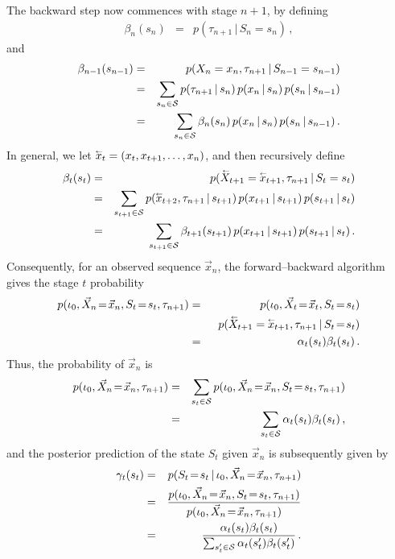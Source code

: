 \documentclass[a4paper]{article}
\newcommand{\rvec}[1]{\accentset{\leftarrow}{#1}}
\begin{document}
The backward step now commences with stage $n+1$, by defining
\begin{eqnarray}
  \beta_{n}(s_{n}) & = & p(\tau_{n+1}\,|\,S_n=s_{n})
\,,
\end{eqnarray}
and 
\begin{eqnarray}
  \beta_{n-1}(s_{n-1}) & = & p(X_n=x_{n},\tau_{n+1}\,|\,S_{n-1}=s_{n-1})
\nonumber\\
& = &
\sum_{s_n\in{\cal S}}p(\tau_{n+1}\,|\,s_{n})\,p(x_n\,|\,s_n)\,p(s_n\,|\,s_{n-1})
\nonumber\\
& = &
\sum_{s_n\in{\cal S}}\beta_n(s_{n})\,p(x_n\,|\,s_n)\,p(s_n\,|\,s_{n-1})
\,.
\end{eqnarray}
In general, we let $\rvec{x}_t=(x_t,x_{t+1},\ldots,x_n)$, and then recursively define
\begin{eqnarray}
  \beta_{t}(s_{t}) & = & p(\rvec{X}_{t+1}=\rvec{x}_{t+1},\tau_{n+1}\,|\,S_t=s_{t})
\nonumber\\
& = &
\sum_{s_{t+1}\in{\cal S}}
  p(\rvec{x}_{t+2},\tau_{n+1}\,|\,s_{t+1})\,p(x_{t+1}\,|\,s_{t+1})\,p(s_{t+1}\,|\,s_t)
\nonumber\\
& = &
\sum_{s_{t+1}\in{\cal S}}\beta_{t+1}(s_{t+1})\,p(x_{t+1}\,|\,s_{t+1})\,p(s_{t+1}\,|\,s_t)
\,.
\end{eqnarray}
Consequently, for an observed sequence $\vec{x}_n$,  the forward--backward algorithm 
gives the stage $t$ probability
\begin{eqnarray}
  p(\iota_0,\vec{X}_n\!=\!\vec{x}_n,S_t\!=\!s_t,\tau_{n+1}) & = & 
  p(\iota_0,\vec{X}_t\!=\!\vec{x}_t,S_t\!=\!s_t)
\nonumber\\&& 
\;\;p(\rvec{X}_{t+1}=\rvec{x}_{t+1},\tau_{n+1}\,|\,S_t\!=\!s_t)
\nonumber\\& = &
  \alpha_t(s_t)\beta_t(s_t)\,.
\end{eqnarray}
Thus, the probability of $\vec{x}_n$  is
\begin{eqnarray}
  p(\iota_0,\vec{X}_n\!=\!\vec{x}_n,\tau_{n+1}) & = & 
  \sum_{s_t\in{\cal S}}p(\iota_0,\vec{X}_n\!=\!\vec{x}_n,S_t\!=\!s_t,\tau_{n+1})
\nonumber\\& = &
  \sum_{s_t\in{\cal S}}\alpha_t(s_t)\beta_t(s_t)\,,
\end{eqnarray}
and the posterior prediction of the state $S_t$ given $\vec{x}_n$ is subsequently given by
\begin{eqnarray}
\gamma_t(s_t) & = &
  p(S_t\!=\!s_t\,|\,\iota_0,\vec{X}_n\!=\!\vec{x}_n,\tau_{n+1}) 
\nonumber\\& = & 
\frac{p(\iota_0,\vec{X}_n\!=\!\vec{x}_n,S_t\!=\!s_t,\tau_{n+1})}
       {p(\iota_0,\vec{X}_n\!=\!\vec{x}_n,\tau_{n+1})}
\nonumber\\& = &
\frac{\alpha_t(s_t)\beta_t(s_t)}{\sum_{s_t'\in{\cal S}}\alpha_t(s_t')\beta_t(s_t')}\,.
\label{eq:gamma-def}
\end{eqnarray}
\end{document}
